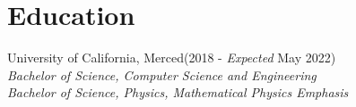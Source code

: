 \documentclass[./Resume.tex]{subfiles}
\begin{document}
\section{Education}
University of California, Merced\null\hfill(2018 - \emph{Expected} May 2022)\\
		   \emph{Bachelor of Science, Computer Science and Engineering}\\
		   \emph{Bachelor of Science, Physics, Mathematical Physics Emphasis}
\end{document}
